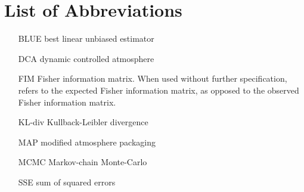 \chapter*{List of Abbreviations}
\begin{itemize}[labelwidth={0em},font=\bfseries,align=right]
\item [BLUE] best linear unbiased estimator
\item [DCA] dynamic controlled atmosphere
\item [FIM] Fisher information matrix. When used without further specification, refers to the expected Fisher information matrix, as opposed to {\color{red}the} observed Fisher information matrix.
\item [KL-div] Kullback-Leibler divergence
\item [MAP] modified atmosphere packaging
\item [MCMC] Markov-chain Monte-Carlo
\item [SSE] sum of squared error{\color{red}s}
\end{itemize}

